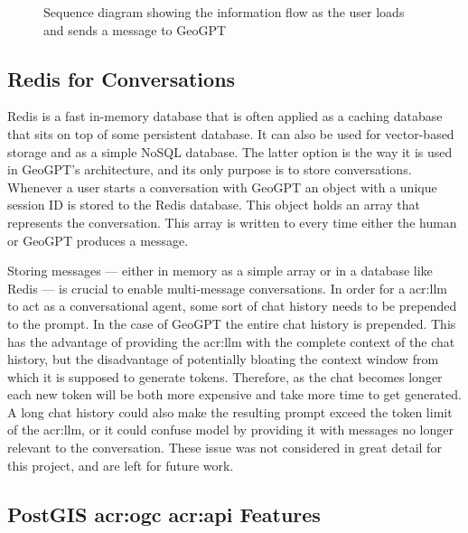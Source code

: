 \begin{figure}
    \caption{Sequence diagram showing the information flow as the user loads and sends a message to GeoGPT}
    \label{fig:sequence-diagram}
\end{figure}


\subsection{Redis for Conversations}

Redis \citep{sanfilippoRedisRealtimeData2009} is a fast in-memory database that is often applied as a caching database that sits on top of some persistent database. It can also be used for vector-based storage and as a simple NoSQL database. The latter option is the way it is used in GeoGPT's architecture, and its only purpose is to store conversations. Whenever a user starts a conversation with GeoGPT an object with a unique session ID is stored to the Redis database. This object holds an array that represents the conversation. This array is written to every time either the human or GeoGPT produces a message.

Storing messages --- either in memory as a simple array or in a database like Redis --- is crucial to enable multi-message conversations. In order for a \gls{acr:llm} to act as a conversational agent, some sort of chat history needs to be prepended to the prompt. In the case of GeoGPT the entire chat history is prepended. This has the advantage of providing the \gls{acr:llm} with the complete context of the chat history, but the disadvantage of potentially bloating the context window from which it is supposed to generate tokens. Therefore, as the chat becomes longer each new token will be both more expensive and take more time to get generated. A long chat history could also make the resulting prompt exceed the token limit of the \gls{acr:llm}, or it could confuse model by providing it with messages no longer relevant to the conversation. These issue was not considered in great detail for this project, and are left for future work.

\subsection[PostGIS and OGC API Features]{PostGIS \acrshort{acr:ogc} \acrshort{acr:api} Features}

